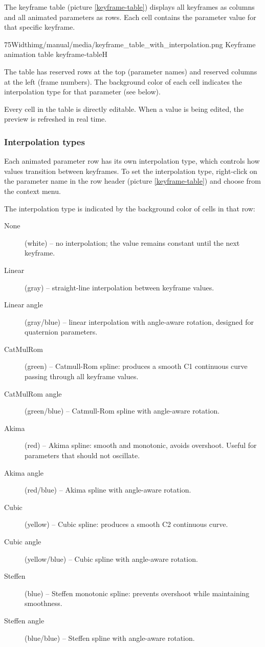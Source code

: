 The keyframe table (picture \ref{keyframe-table}) displays all keyframes as columns and all animated parameters as rows. Each cell contains the parameter value for that specific keyframe.

\simpleImageWithCaption75Width{img/manual/media/keyframe_table_with_interpolation.png}
{Keyframe animation table}
{keyframe-table}{H}

The table has reserved rows at the top (parameter names) and reserved columns at the left (frame numbers). The background color of each cell indicates the interpolation type for that parameter (see below).

Every cell in the table is directly editable. When a value is being edited, the preview is refreshed in real time.

\subsubsection{Interpolation types}

Each animated parameter row has its own interpolation type, which controls how values transition between keyframes. To set the interpolation type, right-click on the parameter name in the row header (picture \ref{keyframe-table}) and choose from the context menu.

The interpolation type is indicated by the background color of cells in that row:

\begin{description}
	\item[None] (white) -- no interpolation; the value remains constant until the next keyframe.
	\item[Linear] (gray) -- straight-line interpolation between keyframe values.
	\item[Linear angle] (gray/blue) -- linear interpolation with angle-aware rotation, designed for quaternion parameters.
	\item[CatMulRom] (green) -- Catmull-Rom spline: produces a smooth C1 continuous curve passing through all keyframe values.
	\item[CatMulRom angle] (green/blue) -- Catmull-Rom spline with angle-aware rotation.
	\item[Akima] (red) -- Akima spline: smooth and monotonic, avoids overshoot. Useful for parameters that should not oscillate.
	\item[Akima angle] (red/blue) -- Akima spline with angle-aware rotation.
	\item[Cubic] (yellow) -- Cubic spline: produces a smooth C2 continuous curve.
	\item[Cubic angle] (yellow/blue) -- Cubic spline with angle-aware rotation.
	\item[Steffen] (blue) -- Steffen monotonic spline: prevents overshoot while maintaining smoothness.
	\item[Steffen angle] (blue/blue) -- Steffen spline with angle-aware rotation.
\end{description}

